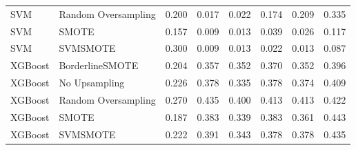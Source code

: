 \begin{tabular}{llllllll}
                         SVM & Random Oversampling & 0.200 &                     0.017 &                 0.022 &                  0.174 &                                   0.209 &     0.335 \\
                         SVM &               SMOTE & 0.157 &                     0.009 &                 0.013 &                  0.039 &                                   0.026 &     0.117 \\
                         SVM &            SVMSMOTE & 0.300 &                     0.009 &                 0.013 &                  0.022 &                                   0.013 &     0.087 \\
                     XGBoost &     BorderlineSMOTE & 0.204 &                     0.357 &                 0.352 &                  0.370 &                                   0.352 &     0.396 \\
                     XGBoost &       No Upsampling & 0.226 &                     0.378 &                 0.335 &                  0.378 &                                   0.374 &     0.409 \\
                     XGBoost & Random Oversampling & 0.270 &                     0.435 &                 0.400 &                  0.413 &                                   0.413 &     0.422 \\
                     XGBoost &               SMOTE & 0.187 &                     0.383 &                 0.339 &                  0.383 &                                   0.361 &     0.443 \\
                     XGBoost &            SVMSMOTE & 0.222 &                     0.391 &                 0.343 &                  0.378 &                                   0.378 &     0.435 \\
\bottomrule
\end{tabular}
